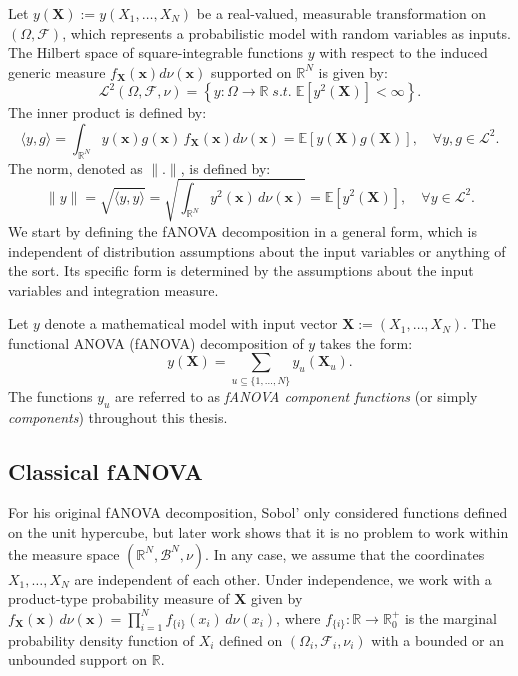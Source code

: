 Let $y(\boldsymbol{X}) := y(X_1, \dots, X_N)$ be a real-valued, measurable transformation on $(\Omega, \mathcal{F})$, which represents a probabilistic model with random variables as inputs. The Hilbert space of square-integrable functions $y$ with respect to the induced generic measure $f_{\boldsymbol{X}}(\boldsymbol{x})d \nu (\boldsymbol{x})$ supported on $\mathbb{R}^N$ is given by:
\[
\mathcal{L}^2(\Omega, \mathcal{F}, \nu) = \left\{ y: \Omega \rightarrow \mathbb{R} \; \textit{s.t.} \; \mathbb{E}[y^2(\boldsymbol{X})] < \infty \right\}.
\]
The inner product is defined by:
\[
\langle y, g \rangle = \int_{\mathbb{R}^N} y(\boldsymbol{x}) g(\boldsymbol{x}) \, f_{\boldsymbol{X}}(\boldsymbol{x})d\nu(\boldsymbol{x}) = \mathbb{E}[y(\boldsymbol{X})g(\boldsymbol{X})], \quad \forall y,g \in \mathcal{L}^2.
\]
The norm, denoted as $\|.\|$, is defined by:
\[
\|y\| = \sqrt{\langle y, y \rangle} = \sqrt{\int_{\mathbb{R}^N} y^2(\boldsymbol{x}) \, d\nu(\boldsymbol{x})} = \mathbb{E}[y^2(\boldsymbol{X})], \quad \forall y \in \mathcal{L}^2.
\]
We start by defining the fANOVA decomposition in a general form, which is independent of distribution assumptions about the input variables or anything of the sort. Its specific form is determined by the assumptions about the input variables and integration measure.
\newpage
\begin{definition}\label{def:fanova_decomposition}
Let $y$ denote a mathematical model with input vector $\boldsymbol{X} := (X_1, \dots, X_N)$. 
The functional ANOVA (fANOVA) decomposition of $y$ takes the form:
\begin{equation}
    y(\boldsymbol{X}) = \sum_{u \subseteq \{1, \dots, N\}} y_{u}(\boldsymbol{X}_u).
\end{equation}
The functions $y_u$ are referred to as \emph{fANOVA component functions} 
(or simply \emph{components}) throughout this thesis.
\end{definition}

\subsection{Classical fANOVA}
For his original fANOVA decomposition, Sobol' only considered functions defined on the unit hypercube, but later work shows that it is no problem to work within the measure space $(\mathbb{R}^N, \mathcal{B}^N, \nu)$.
In any case, we assume that the coordinates $X_1, \dots , X_N$ are independent of each other.
Under independence, we work with a product-type probability measure of $\boldsymbol{X}$ given by \(f_{\boldsymbol{X}}(\boldsymbol{x}) \, d\nu(\boldsymbol{x}) = \prod_{i=1}^{N} f_{\{i\}}(x_i) \, d\nu(x_i)\), where \(f_{\{i\}}: \mathbb{R} \rightarrow \mathbb{R}_{0}^{+}\) is the marginal probability density function of \(X_i\) defined on $(\Omega_i, \mathcal{F}_i, \nu_i)$ with a bounded or an unbounded support on $\mathbb{R}$.

